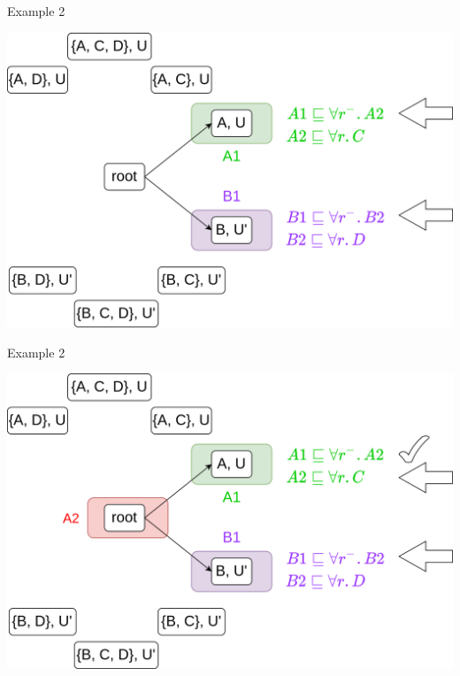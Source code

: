 \documentclass[10pt]{beamer}
\begin{document}
\begin{frame}[fragile]{Example 2}
  \begin{center}
  \includegraphics[scale=.25]{img/ex_1.png}
  \end{center}
\end{frame}

\begin{frame}[fragile]{Example 2 }
  \begin{center}
  \includegraphics[scale=.25]{img/ex2_2.png}
  \end{center}
\end{frame}
\end{document}

